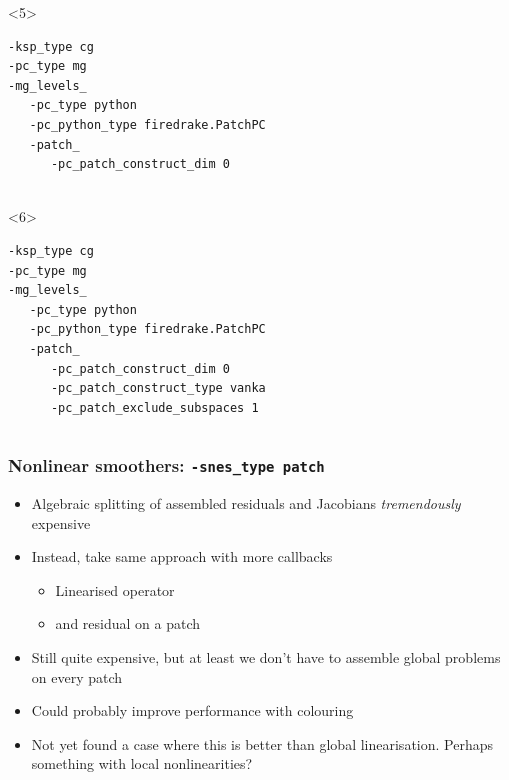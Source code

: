 \documentclass[presentation,aspectratio=43,10pt]{beamer}
\begin{document}
\begin{frame}[fragile]
\begin{columns}
\begin{column}{0.6\textwidth}
\begin{onlyenv}
\begin{verbatim}
\end{verbatim}
      \end{onlyenv}
      \begin{onlyenv}<5>
\begin{verbatim}
-ksp_type cg
-pc_type mg
-mg_levels_
   -pc_type python
   -pc_python_type firedrake.PatchPC
   -patch_
      -pc_patch_construct_dim 0


\end{verbatim}
      \end{onlyenv}
      \begin{onlyenv}<6>
\begin{verbatim}
-ksp_type cg
-pc_type mg
-mg_levels_
   -pc_type python
   -pc_python_type firedrake.PatchPC
   -patch_
      -pc_patch_construct_dim 0
      -pc_patch_construct_type vanka
      -pc_patch_exclude_subspaces 1
\end{verbatim}
      \end{onlyenv}
    \end{column}
  \end{columns}
\end{frame}

\begin{frame}
  \frametitle{Nonlinear smoothers: \texttt{-snes\_type patch}}
  \begin{itemize}
  \item Algebraic splitting of assembled residuals and Jacobians
    \emph{tremendously} expensive
  \item Instead, take same approach with more callbacks
    \begin{itemize}
    \item Linearised operator
    \item and residual on a patch
    \end{itemize}
  \item Still quite expensive, but at least we don't have to assemble
    global problems on every patch
  \item Could probably improve performance with colouring
  \item Not yet found a case where this is better than global
    linearisation. Perhaps something with local nonlinearities?
  \end{itemize}
\end{frame}
\end{document}
